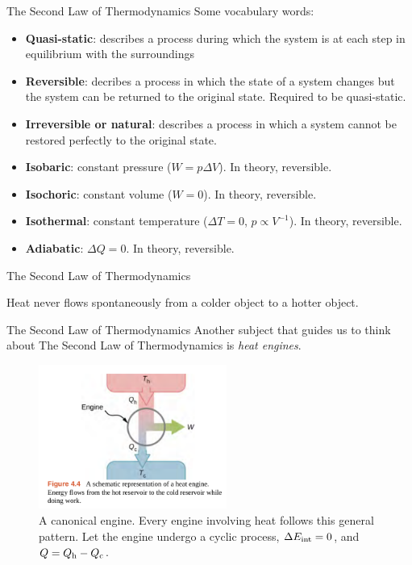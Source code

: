 \documentclass{beamer}
\begin{document}
\begin{frame}{The Second Law of Thermodynamics}
\small
Some vocabulary words:
\begin{itemize}
\item \textbf{Quasi-static}: describes a process during which the system is at each step in equilibrium with the surroundings
\item \textbf{Reversible}: decribes a process in which the state of a system changes but the system can be returned to the original state.  Required to be quasi-static.
\item \textbf{Irreversible or natural}: describes a process in which a system cannot be restored perfectly to the original state.
\item \textbf{Isobaric}: constant pressure ($W=p\Delta V$).  In theory, reversible.
\item \textbf{Isochoric}: constant volume ($W=0$).  In theory, reversible.
\item \textbf{Isothermal}: constant temperature ($\Delta T = 0$, $p \propto V^{-1}$).  In theory, reversible.
\item \textbf{Adiabatic}: $\Delta Q = 0$.  In theory, reversible.
\end{itemize}
\end{frame}

\begin{frame}{The Second Law of Thermodynamics}
\begin{tcolorbox}[colback=white,colframe=red!40!blue,title=The \textit{Clausius Statement} of the Second Law of Thermodynamics]
\alert{Heat never flows spontaneously from a colder object to a hotter object.}
\end{tcolorbox}
\end{frame}

\begin{frame}{The Second Law of Thermodynamics}
Another subject that guides us to think about The Second Law of Thermodynamics is \textit{heat engines}.
\begin{figure}
\centering
\includegraphics[width=0.55\textwidth]{figures/engine.png}
\caption{\label{fig:engine} A canonical engine.  Every engine involving heat follows this general pattern.  Let the engine undergo a cyclic process, $\Delta E_{\rm int} = 0$, and $Q = Q_{\rm h} - Q_{\rm c}$.}
\end{figure}
\end{frame}
\end{document}
